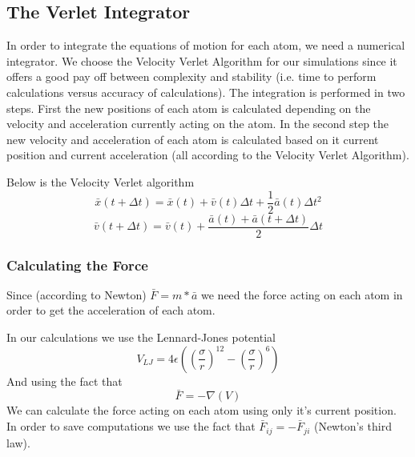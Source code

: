 \subsection{The Verlet Integrator}
In order to integrate the equations of motion for each atom, we need a numerical
integrator. We choose the Velocity Verlet Algorithm for our simulations since it
offers a good pay off between complexity and stability (i.e. time to perform
calculations versus accuracy of calculations). The integration is performed in
two steps. First the new positions of each atom is calculated depending on the
velocity and acceleration currently acting on the atom. In the second step the
new velocity and acceleration of each atom is calculated based on it current
position and current acceleration (all according to the Velocity Verlet
Algorithm).

Below is the Velocity Verlet algorithm
\begin{equation}
\bar{x}(t + \Delta t) = \bar{x}(t) + \bar{v}(t)\Delta t +
\frac{1}{2}\bar{a}(t)\Delta t^2
\end{equation}
\begin{equation}
\bar{v}(t + \Delta t) = \bar{v}(t) + \frac{\bar{a}(t) + \bar{a}(t+\Delta t)}{2}\Delta t
\end{equation}

\subsubsection{Calculating the Force}
Since (according to Newton) $\bar{F} = m*\bar{a}$ we need the force acting on
each atom in order to get the acceleration of each atom.

In our calculations we use the Lennard-Jones potential
\begin{equation}
V_{LJ} = 4\epsilon\left( \left(\frac{\sigma}{r}\right)^{12} - \left(
\frac{\sigma}{r} \right)^6 \right)
\end{equation}
And using the fact that 
\begin{equation}
\bar{F} = -\nabla(V)
\end{equation}
We can calculate the force acting on each atom using only it's current position.
In order to save computations we use the fact that $\bar{F}_{ij} = -
\bar{F}_{ji}$ (Newton's third law).
